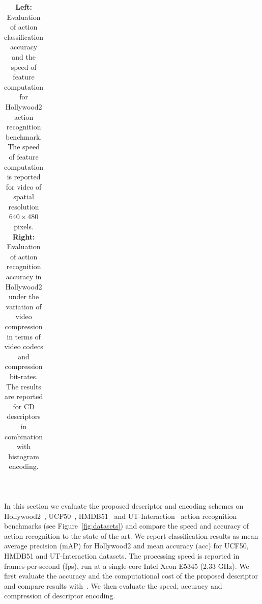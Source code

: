 \documentclass[10pt,twocolumn,letterpaper]{article}
\begin{document}
\begin{table}[t!]
\begin{center}
\begin{tabular}{p{}p{}}
\end{tabular}
\mbox{}\vspace{.1cm}\\
\caption{{\bf Left:} Evaluation of action classification accuracy and the speed of feature computation for Hollywood2 action recognition benchmark. The speed of feature computation is reported for video of spatial resolution $640\times480$ pixels.
{\bf Right:} Evaluation of action recognition accuracy in Hollywood2 under the variation of video compression in terms of video codecs and compression bit-rates. The results are reported for CD descriptors in combination with histogram encoding.
\vspace{-.4cm}}
\label{tab:HWD2}
\end{center}
\end{table}


In this section we evaluate the proposed descriptor and encoding schemes on Hollywood2~\cite{Marszalek09}, UCF50~\cite{Reddy12}, HMDB51~\cite{Kuehne11} and UT-Interaction~\cite{Ryoo10} action recognition benchmarks (see Figure~\ref{fig:datasets}) and compare the speed and accuracy of action recognition  to the state of the art. We report classification results as mean average precision (mAP) for Hollywood2 and mean accuracy (acc) for UCF50, HMDB51 and UT-Interaction datasets. The processing speed is reported in frames-per-second (fps), run at a single-core Intel Xeon E5345 (2.33 GHz). We first evaluate the accuracy and the computational cost of the proposed descriptor and compare results with~\cite{Wang12}. We then evaluate the speed, accuracy and compression of descriptor encoding.

\end{document}
